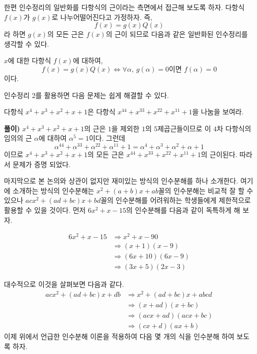 \documentclass[a4paper]{article}
\begin{document}
  한편 인수정리의 일반화를 다항식의 근이라는 측면에서 접근해 보도록 하자. 다항식 $f(x)$가 $g(x)$로 나누어떨어진다고 가정하자. 즉,
  \[
  f(x) = g(x) Q(x)
  \]
라 하면 $g(x)$의 모든 근은 $f(x)$의 근이 되므로 다음과 같은 일반화된 인수정리를 생각할 수 있다. 
\vspace{1em}
\begin{theorem}
$x$에 대한 다항식 $f(x)$에 대하여,
\[
f(x) = g(x)Q(x) \Leftrightarrow \forall \alpha, \: g(\alpha)=0 \text{이면 } f(\alpha)=0
\]
이다.
\end{theorem}
 

  인수정리 2를 활용하면 다음 문제는 쉽게 해결할 수 있다.
\vspace{1em}
\begin{problem}
 다항식 $ x^4 + x^3 + x^2 + x+1$은 다항식 $x^{44} + x^{33} + x^{22} + x^{11} + 1$을 나눔을 보여라.
\end{problem}

\textbf{풀이)} $ x^4 + x^3 + x^2 + x+1$의 근은 $1$을 제외한 $1$의 $5$제곱근들이므로 이 $4$차 다항식의 임의의 근 $\alpha$에 대하여 $\alpha^{5} = 1$이다. 그런데
\[
\alpha^{44} + \alpha^{33} + \alpha^{22} + \alpha^{11} + 1 = \alpha^4 + \alpha^3 + \alpha^2 + \alpha + 1
\]
이므로 $ x^4 + x^3 + x^2 + x+1$의 모든 근은  $x^{44} + x^{33} + x^{22} + x^{11} + 1$의 근이된다. 따라서 문제가 증명 되었다.\vspace{1em}
 
 
  마지막으로 본 논의와 상관이 없지만 재미있는 방식의 인수분해를 하나 소개한다. 여기에 소개하는 방식의 인수분해는 $x^2+(a+b)x+ab$꼴의 인수분해는 비교적 잘 할 수 있으나 $acx^2+(ad+bc)x+bd$꼴의 인수분해를 어려워하는 학생들에게 제한적으로 활용할 수 있을 것이다. 먼저 $6x^2+x-15$의 인수분해를 다음과 같이 독특하게 해 보자.
  
  \begin{align*}
      6x^2+x-15 &\Rightarrow x^2+x-90 \\
      &\Rightarrow (x+1)(x-9) \\
      &\Rightarrow (6x+10)(6x-9) \\
      & \Rightarrow (3x+5)(2x-3)
  \end{align*}

 대수적으로 이것을 살펴보면 다음과 같다.
\begin{align*}
      acx^2 +(ad+bc)x + db &\Rightarrow x^2+(ad+bc)x +abcd \\
      &\Rightarrow (x+ad)(x+bc) \\
      &\Rightarrow (acx+ad)(acx+bc) \\
      & \Rightarrow (cx+d)(ax+b)
  \end{align*}
  이제 위에서 언급한 인수분해 이론을 적용하여 다음 몇 개의 식을 인수분해 하여 보도록 하자.
\end{document}
